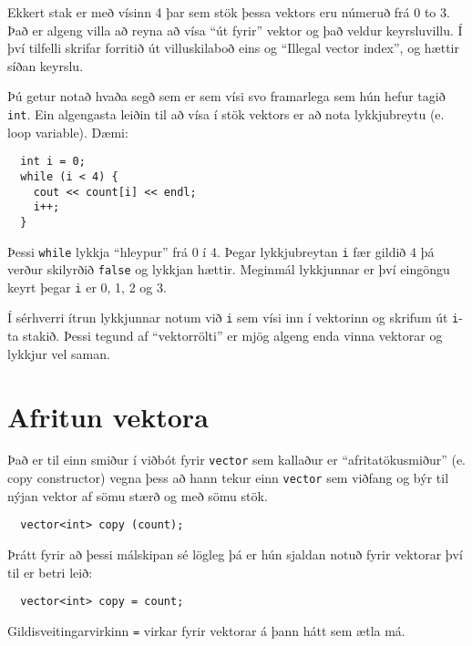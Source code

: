 \vspace{0.1in}
\centerline{}
\vspace{0.1in}

Ekkert stak er með vísinn 4 þar sem stök þessa vektors eru númeruð frá 0 to 3.
Það er algeng villa að reyna að vísa ``út fyrir'' vektor og það veldur keyrsluvillu.
Í því tilfelli skrifar forritið út villuskilaboð eins og ``Illegal vector index'', og hættir síðan keyrslu.


Þú getur notað hvaða segð sem er sem vísi svo framarlega sem hún hefur tagið {\tt int}.
Ein algengasta leiðin til að vísa í stök vektors er að nota lykkjubreytu (e. loop variable).
Dæmi:

\begin{verbatim}
  int i = 0;
  while (i < 4) {
    cout << count[i] << endl;
    i++;
  }
\end{verbatim}
%
Þessi {\tt while} lykkja ``hleypur'' frá 0 í 4.
Þegar lykkjubreytan {\tt i} fær gildið 4 þá verður skilyrðið {\tt false} og lykkjan hættir.
Meginmál lykkjunnar er því eingöngu keyrt þegar {\tt i} er 0, 1, 2 og 3.


Í sérhverri ítrun lykkjunnar notum við {\tt i} sem vísi inn í vektorinn og skrifum út {\tt i}-ta stakið.
Þessi tegund af ``vektorrölti'' er mjög algeng enda vinna vektorar og lykkjur vel saman.

\section{Afritun vektora}

Það er til einn smiður í viðbót fyrir {\tt vector} sem kallaður er ``afritatökusmiður'' (e. copy constructor)
vegna þess að hann tekur einn {\tt vector} sem viðfang og býr til nýjan vektor af sömu stærð og með sömu stök.

\begin{verbatim}
  vector<int> copy (count);
\end{verbatim}
%
Þrátt fyrir að þessi málskipan sé lögleg þá er hún sjaldan notuð fyrir vektorar því til er betri leið:

\begin{verbatim}
  vector<int> copy = count;
\end{verbatim}
%
Gildisveitingarvirkinn {\tt =} virkar fyrir vektorar á þann hátt sem ætla má.

